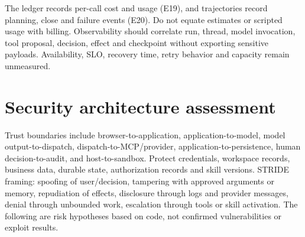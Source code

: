 \documentclass[10pt,letterpaper]{article}
\begin{document}
The ledger records per-call cost and usage (E19), and trajectories record planning, close and failure events (E20). Do not equate estimates or scripted usage with billing. Observability should correlate run, thread, model invocation, tool proposal, decision, effect and checkpoint without exporting sensitive payloads. Availability, SLO, recovery time, retry behavior and capacity remain unmeasured.
\section{Security architecture assessment}
Trust boundaries include browser-to-application, application-to-model, model output-to-dispatch, dispatch-to-MCP/provider, application-to-persistence, human decision-to-audit, and host-to-sandbox. Protect credentials, workspace records, business data, durable state, authorization records and skill versions. STRIDE framing: spoofing of user/decision, tampering with approved arguments or memory, repudiation of effects, disclosure through logs and provider messages, denial through unbounded work, escalation through tools or skill activation. The following are risk hypotheses based on code, not confirmed vulnerabilities or exploit results.
\end{document}
